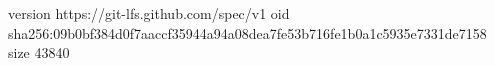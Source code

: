 version https://git-lfs.github.com/spec/v1
oid sha256:09b0bf384d0f7aaccf35944a94a08dea7fe53b716fe1b0a1c5935e7331de7158
size 43840
